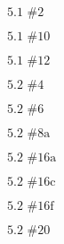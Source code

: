 \documentclass{article}
\newcommand{\problem}[2]{$\boxed{\text{#1 \##2}}$}
\begin{document}
%
\problem{5.1}{2}


%
\problem{5.1}{10}

%
\problem{5.1}{12}

%
\problem{5.2}{4}

%
\problem{5.2}{6}

%
\problem{5.2}{8a}

%
\problem{5.2}{16a}

%
\problem{5.2}{16c}

%
\problem{5.2}{16f}

%
\problem{5.2}{20}
\end{document}
